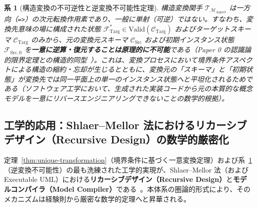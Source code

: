 \documentclass[11pt,a4paper]{ltjsarticle}
\theoremstyle{definition}
\theoremstyle{plain}
\newtheorem{corollary}{系}[section]
\theoremstyle{remark}
\newcommand{\Valid}{\mathrm{Valid}}
\newcommand{\CSrc}{\mathcal{C}_{\mathrm{Src}}}
\newcommand{\CTarg}{\mathcal{C}_{\mathrm{Targ}}}
\newcommand{\MAspect}{\mathcal{M}_{\mathrm{Aspect}}}
\begin{document}
\begin{corollary}[構造変換の不可逆性と逆変換不可能性定理]\label{cor:irreversibility}
構造変換関手 $\mathcal{T}_{\MAspect}$ は一方向（\texttt{=>}）の次元転換作用素であり、一般に単射（可逆）ではない。すなわち、変換先意味の場に構成された状態 $\mathcal{F}_{\mathrm{Targ}}^* \in \Valid(\CTarg)$ およびターゲットスキーマ $\CTarg$ のみから、元の変換元スキーマ $\CSrc$ および初期インスタンス状態 $\mathcal{F}_{\mathrm{Src}, 0}$ を\textbf{一意に逆算・復元することは原理的に不可能}である（Paper 0 の認識論的限界定理との構造的同型~\cite{ota2026paper0}）。これは、変換プロセスにおいて境界条件アスペクトによる構造の縮約・忘却が生じるとともに、変換元の「スキーマ」と「初期状態」が変換先では同一平面上の単一のインスタンス状態へと平坦化されるためである（ソフトウェア工学において、生成された実装コードから元の本質的な概念モデルを一意にリバースエンジニアリングできないことの数学的根拠）。
\end{corollary}

\subsection{工学的応用：Shlaer--Mellor 法におけるリカーシブデザイン（Recursive Design）の数学的厳密化}
定理~\ref{thm:unique-transformation}（境界条件に基づく一意変換定理）および系~\ref{cor:irreversibility}（逆変換不可能性）の最も洗練された工学的実現が、Shlaer--Mellor 法（および Executable UML）における\textbf{リカーシブデザイン（Recursive Design）}と\textbf{モデルコンパイラ（Model Compiler）}である~\cite{shlaer1992,mellor2002}。本体系の圏論的形式により、そのメカニズムは経験則から厳密な数学的定理へと昇華される。
\end{document}
